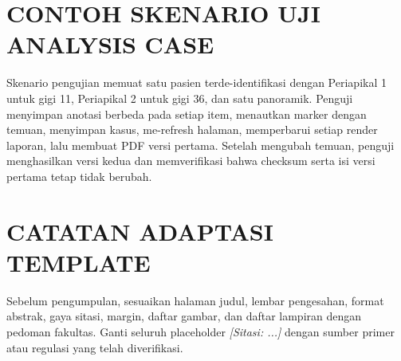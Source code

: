 \documentclass[12pt,a4paper,oneside]{report}
\begin{document}
\appendix
\chapter{CONTOH SKENARIO UJI ANALYSIS CASE}
Skenario pengujian memuat satu pasien terde-identifikasi dengan Periapikal 1 untuk gigi 11, Periapikal 2 untuk gigi 36, dan satu panoramik. Penguji menyimpan anotasi berbeda pada setiap item, menautkan marker dengan temuan, menyimpan kasus, me-refresh halaman, memperbarui setiap render laporan, lalu membuat PDF versi pertama. Setelah mengubah temuan, penguji menghasilkan versi kedua dan memverifikasi bahwa checksum serta isi versi pertama tetap tidak berubah.

\chapter{CATATAN ADAPTASI TEMPLATE}
Sebelum pengumpulan, sesuaikan halaman judul, lembar pengesahan, format abstrak, gaya sitasi, margin, daftar gambar, dan daftar lampiran dengan pedoman fakultas. Ganti seluruh placeholder \textit{[Sitasi: ...]} dengan sumber primer atau regulasi yang telah diverifikasi.
\end{document}
